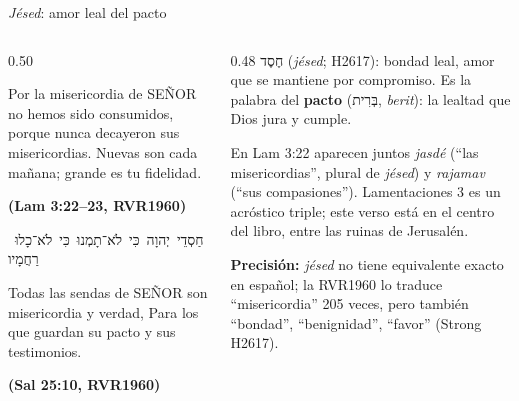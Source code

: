 \documentclass[hyperref={bookmarks=false},aspectratio=169]{beamer}
\newcommand{\heb}[1]{\mbox{\foreignlanguage{hebrew}{#1}}}
\newcommand{\SENOR}{S{\fontsize{0.78em}{1em}\selectfont EÑOR}}
\newcommand{\fuente}[1]{\par\hfill{\upshape\bfseries\footnotesize\textcolor{azul}{#1}}}
\newcommand{\destacar}[1]{\textbf{\textcolor{azul}{#1}}}
\newcommand{\precision}[1]{{\footnotesize\color{gris}\textbf{Precisión:} #1}}
\begin{document}
\begin{frame}{\emph{Jésed}: amor leal del pacto}
\begin{columns}[t,onlytextwidth]
\begin{column}{0.50\textwidth}
\begin{cita}Por la misericordia de \SENOR{} no hemos sido consumidos, porque nunca decayeron sus misericordias. Nuevas son cada mañana; grande es tu fidelidad.\fuente{(Lam 3:22--23, RVR1960)}\end{cita}
\begin{center}\heb{חַסְדֵי יְהוָה כִּי לֹא־תָמְנוּ כִּי לֹא־כָלוּ רַחֲמָיו}\end{center}
\begin{cita}Todas las sendas de \SENOR{} son misericordia y verdad, Para los que guardan su pacto y sus testimonios.\fuente{(Sal 25:10, RVR1960)}\end{cita}
\end{column}
\begin{column}{0.48\textwidth}\scriptsize
\heb{חֶסֶד} (\emph{jésed}; H2617): bondad leal, amor que se mantiene por compromiso. Es la palabra del \destacar{pacto} (\heb{בְּרִית}, \emph{berit}): la lealtad que Dios jura y cumple.\par\smallskip
En Lam 3:22 aparecen juntos \emph{jasdé} (``las misericordias'', plural de \emph{jésed}) y \emph{rajamav} (``sus compasiones''). Lamentaciones 3 es un acróstico triple; este verso está en el centro del libro, entre las ruinas de Jerusalén.\par\smallskip
\precision{\emph{jésed} no tiene equivalente exacto en español; la RVR1960 lo traduce ``misericordia'' 205 veces, pero también ``bondad'', ``benignidad'', ``favor'' (Strong H2617).}
\end{column}
\end{columns}
\end{frame}
\end{document}
